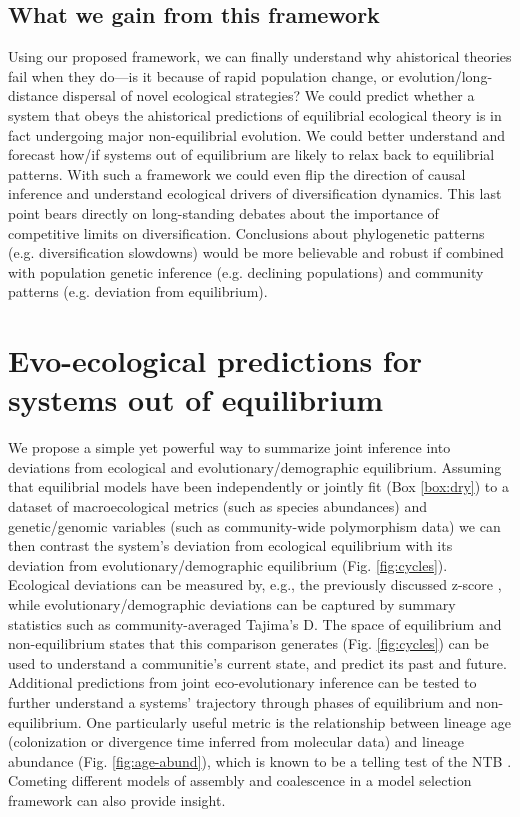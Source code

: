 \documentclass[12pt]{article}
\newcounter{Box}
\begin{document}
\subsection{What we gain from this framework}

Using our proposed framework, we can finally understand why
ahistorical theories fail when they do---is it because of rapid
population change, or evolution/long-distance dispersal of novel
ecological strategies? We could predict whether a system that obeys
the ahistorical predictions of equilibrial ecological theory is in
fact undergoing major non-equilibrial evolution. We could better
understand and forecast how/if systems out of equilibrium are likely
to relax back to equilibrial patterns. With such a framework we could
even flip the direction of causal inference and understand ecological
drivers of diversification dynamics. This last point bears directly on
long-standing debates about the importance of competitive limits on
diversification\citep{rabosky2009, harmon2015amNat}. Conclusions about
phylogenetic patterns (e.g. diversification slowdowns) would be more
believable and robust if combined with population genetic inference
(e.g. declining populations) and community patterns (e.g.  deviation
from equilibrium).

\section{Evo-ecological predictions for systems out of equilibrium} \label{sec:pred}

We propose a simple yet powerful way to summarize joint inference into
deviations from ecological and evolutionary/demographic
equilibrium. Assuming that equilibrial models have been independently
or jointly fit (Box \ref{box:dry}) to a dataset of macroecological
metrics (such as species abundances) and genetic/genomic variables
(such as community-wide polymorphism data) we can then contrast the
system's deviation from ecological equilibrium with its deviation from
evolutionary/demographic equilibrium
(Fig. \ref{fig:cycles}). Ecological deviations can be measured by,
e.g., the previously discussed z-score \citep{meteR}, while
evolutionary/demographic deviations can be captured by summary
statistics such as community-averaged Tajima's D. The space of
equilibrium and non-equilibrium states that this comparison generates
(Fig. \ref{fig:cycles}) can be used to understand a communitie's
current state, and predict its past and future. Additional predictions
from joint eco-evolutionary inference can be tested to further
understand a systems' trajectory through phases of equilibrium and
non-equilibrium. One particularly useful metric is the relationship
between lineage age (colonization or divergence time inferred from
molecular data) and lineage abundance (Fig. \ref{fig:age-abund}),
which is known to be a telling test of the NTB \citep{ricklefs2006,
  rosindell2010}.  Cometing different models of assembly and
coalescence in a model selection framework can also provide insight.
\end{document}
